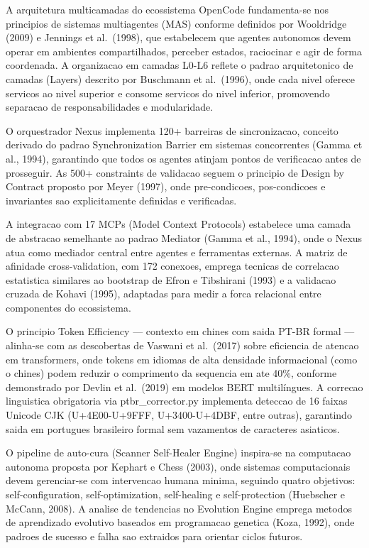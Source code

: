 \documentclass[
  12pt,
]{article}
\begin{document}
A arquitetura multicamadas do ecossistema OpenCode fundamenta-se nos
principios de sistemas multiagentes (MAS) conforme definidos por
Wooldridge (2009) e Jennings et al.~(1998), que estabelecem que agentes
autonomos devem operar em ambientes compartilhados, perceber estados,
raciocinar e agir de forma coordenada. A organizacao em camadas L0-L6
reflete o padrao arquitetonico de camadas (Layers) descrito por
Buschmann et al.~(1996), onde cada nivel oferece servicos ao nivel
superior e consome servicos do nivel inferior, promovendo separacao de
responsabilidades e modularidade.

O orquestrador Nexus implementa 120+ barreiras de sincronizacao,
conceito derivado do padrao Synchronization Barrier em sistemas
concorrentes (Gamma et al., 1994), garantindo que todos os agentes
atinjam pontos de verificacao antes de prosseguir. As 500+ constraints
de validacao seguem o principio de Design by Contract proposto por Meyer
(1997), onde pre-condicoes, pos-condicoes e invariantes sao
explicitamente definidas e verificadas.

A integracao com 17 MCPs (Model Context Protocols) estabelece uma camada
de abstracao semelhante ao padrao Mediator (Gamma et al., 1994), onde o
Nexus atua como mediador central entre agentes e ferramentas externas. A
matriz de afinidade cross-validation, com 172 conexoes, emprega tecnicas
de correlacao estatistica similares ao bootstrap de Efron e Tibshirani
(1993) e a validacao cruzada de Kohavi (1995), adaptadas para medir a
forca relacional entre componentes do ecossistema.

O principio Token Efficiency --- contexto em chines com saida PT-BR
formal --- alinha-se com as descobertas de Vaswani et al.~(2017) sobre
eficiencia de atencao em transformers, onde tokens em idiomas de alta
densidade informacional (como o chines) podem reduzir o comprimento da
sequencia em ate 40\%, conforme demonstrado por Devlin et al.~(2019) em
modelos BERT multilíngues. A correcao linguistica obrigatoria via
ptbr\_corrector.py implementa deteccao de 16 faixas Unicode CJK
(U+4E00-U+9FFF, U+3400-U+4DBF, entre outras), garantindo saida em
portugues brasileiro formal sem vazamentos de caracteres asiaticos.

O pipeline de auto-cura (Scanner Self-Healer Engine) inspira-se na
computacao autonoma proposta por Kephart e Chess (2003), onde sistemas
computacionais devem gerenciar-se com intervencao humana minima,
seguindo quatro objetivos: self-configuration, self-optimization,
self-healing e self-protection (Huebscher e McCann, 2008). A analise de
tendencias no Evolution Engine emprega metodos de aprendizado evolutivo
baseados em programacao genetica (Koza, 1992), onde padroes de sucesso e
falha sao extraidos para orientar ciclos futuros.
\end{document}
